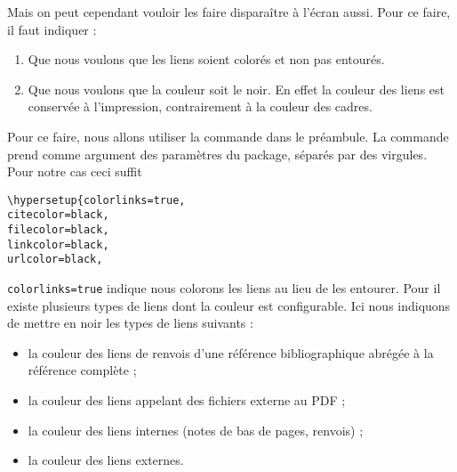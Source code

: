 Mais on peut cependant vouloir les faire disparaître à l'écran aussi. Pour ce faire, il faut indiquer :
\begin{enumerate}
\item Que nous voulons que les liens soient colorés et non pas entourés.
\item Que nous voulons que la couleur soit le noir. En effet la couleur des liens est conservée à l'impression, contrairement à la couleur des cadres.
\end{enumerate}

Pour ce faire, nous allons utiliser la commande  dans le préambule. La commande prend comme argument des paramètres du package, séparés par des virgules.
Pour notre cas ceci suffit
\begin{verbatim}
\hypersetup{colorlinks=true,
citecolor=black,
filecolor=black,
linkcolor=black,
urlcolor=black,
\end{verbatim}

\verb|colorlinks=true| indique nous colorons les liens au lieu de les entourer. Pour  il existe plusieurs types de liens dont la couleur est configurable. Ici nous indiquons de mettre en noir les types de liens suivants  :\begin{itemize}
\item la couleur des liens de renvois d'une référence bibliographique abrégée à la référence complète ;
\item la couleur des liens appelant des fichiers externe au PDF ;
\item la couleur des liens internes (notes de bas de pages, renvois) ;
\item la couleur des liens externes.
\end{itemize}